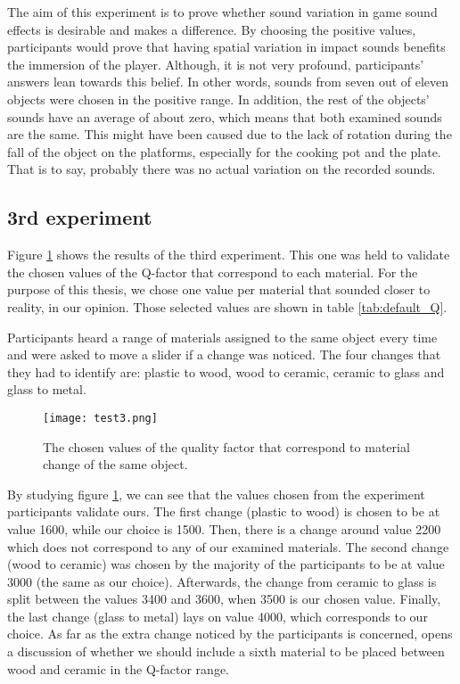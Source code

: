 The aim of this experiment is to prove whether sound variation in game sound effects is desirable and makes a difference. By choosing the positive values, participants would prove that having spatial variation in impact sounds benefits the immersion of the player. Although, it is not very profound, participants' answers lean towards this belief. In other words, sounds from seven out of eleven objects were chosen in the positive range. In addition, the rest of the objects' sounds have an average of about zero, which means that both examined sounds are the same. This might have been caused due to the lack of rotation during the fall of the object on the platforms, especially for the cooking pot and the plate. That is to say, probably there was no actual variation on the recorded sounds.

\subsection{3rd experiment}

Figure \ref{fig:test3} shows the results of the third experiment. This one was held to validate the chosen values of the Q-factor that correspond to each material. For the purpose of this thesis, we chose one value per material that sounded closer to reality, in our opinion. Those selected values are shown in table \ref{tab:default_Q}.  

Participants heard a range of materials assigned to the same object every time and were asked to move a slider if a change was noticed. The four changes that they had to identify are: plastic to wood, wood to ceramic, ceramic to glass and glass to metal.

\begin{figure}[H]
  \centering
    \texttt{[image: test3.png]}
      \caption{The chosen values of the quality factor that correspond to material change of the same object.}\label{fig:test3}
\end{figure}

By studying figure \ref{fig:test3}, we can see that the values chosen from the experiment participants validate ours. The first change (plastic to wood) is chosen to be at value 1600, while our choice is 1500. Then, there is a change around value 2200 which does not correspond to any of our examined materials. The second change (wood to ceramic) was chosen by the majority of the participants to be at value 3000 (the same as our choice). Afterwards, the change from ceramic to glass is split between the values 3400 and 3600, when 3500 is our chosen value. Finally, the last change (glass to metal) lays on value 4000, which corresponds to our choice. As far as the extra change noticed by the participants is concerned, opens a discussion of whether we should include a sixth material to be placed between wood and ceramic in the Q-factor range.

